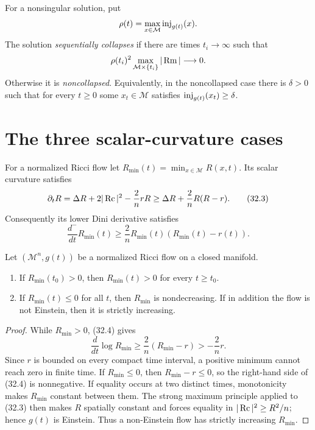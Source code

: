 \begin{definition}
\label{def:chow-iv-sequential-collapse}
For a nonsingular solution, put
\[
 \rho(t)=\max_{x\in\mathcal M}\inj_{g(t)}(x).
\]
The solution \emph{sequentially collapses} if there are times
$t_i\to\infty$ such that
\[
 \rho(t_i)^2\max_{\mathcal M\times\{t_i\}}|\Rm|\longrightarrow0.
\]
Otherwise it is \emph{noncollapsed}.  Equivalently, in the noncollapsed
case there is $\delta>0$ such that for every $t\ge0$ some $x_t\in\mathcal M$
satisfies $\operatorname{inj}_{g(t)}(x_t)\ge\delta$.
\end{definition}

\section{The three scalar-curvature cases}

For a normalized Ricci flow let
$R_{\min}(t)=\min_{x\in\mathcal M}R(x,t)$.  Its scalar curvature satisfies
\begin{equation*}
 \partial_tR=\Delta R+2|\operatorname{Rc}|^2-\frac2n rR
 \ge \Delta R+\frac2nR(R-r).
 \tag{32.3}
\end{equation*}
Consequently its lower Dini derivative satisfies
\begin{equation*}
 \frac{d^-}{dt}R_{\min}(t)
 \ge\frac2nR_{\min}(t)(R_{\min}(t)-r(t)).
 \tag{32.4}
\end{equation*}

\begin{lemma}
\label{lem:chow-iv-minimum-scalar-curvature-monotonicity}
Let $(\mathcal M^n,g(t))$ be a normalized Ricci flow on a closed manifold.
\begin{enumerate}
\item If $R_{\min}(t_0)>0$, then $R_{\min}(t)>0$ for every $t\ge t_0$.
\item If $R_{\min}(t)\le0$ for all $t$, then $R_{\min}$ is nondecreasing.
If in addition the flow is not Einstein, then it is strictly increasing.
\end{enumerate}
\end{lemma}
\begin{proof}
While $R_{\min}>0$, (32.4) gives
\[
 \frac d{dt}\log R_{\min}
 \ge \frac2n(R_{\min}-r)>-\frac2n r.
\]
Since $r$ is bounded on every compact time interval, a positive minimum
cannot reach zero in finite time.  If $R_{\min}\le0$, then
$R_{\min}-r\le0$, so the right-hand side of (32.4) is nonnegative.
If equality occurs at two distinct times, monotonicity makes
$R_{\min}$ constant between them.  The strong maximum principle applied to
(32.3) then makes $R$ spatially constant and forces equality in
$|\operatorname{Rc}|^2\ge R^2/n$; hence $g(t)$ is Einstein.  Thus a non-Einstein flow has
strictly increasing $R_{\min}$.
\end{proof}

